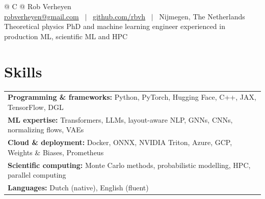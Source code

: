\documentclass[a4paper,10pt]{article}
\begin{document}
\fontsize{10.5pt}{11.8pt}\selectfont
\RaggedRight
{}
\setlength{\parskip}{3pt}

\pagestyle{empty} 



\begin{tabularx}{\linewidth}{@{} C @{}}
\huge{Rob Verheyen} \\[2pt]
\href{mailto:robverheyen@gmail.com}{robverheyen@gmail.com} \ $|$ \
\href{https://github.com/rbvh}{github.com/rbvh} \ $|$ \
Nijmegen, The Netherlands \\[3pt]
Theoretical physics PhD and machine learning engineer experienced in production ML, scientific ML and HPC
\end{tabularx}


\section{Skills}
\begin{tabularx}{\linewidth}{@{}X@{}}
\textbf{Programming \& frameworks:} Python, PyTorch, Hugging Face, C++, JAX, TensorFlow, DGL \\
\textbf{ML expertise:} Transformers, LLMs, layout-aware NLP, GNNs, CNNs, normalizing flows, VAEs \\
\textbf{Cloud \& deployment:} Docker, ONNX, NVIDIA Triton, Azure, GCP, Weights \& Biases, Prometheus \\
\textbf{Scientific computing:} Monte Carlo methods, probabilistic modelling, HPC, parallel computing \\
\textbf{Languages:} Dutch (native), English (fluent) \\
\end{tabularx}
\end{document}
